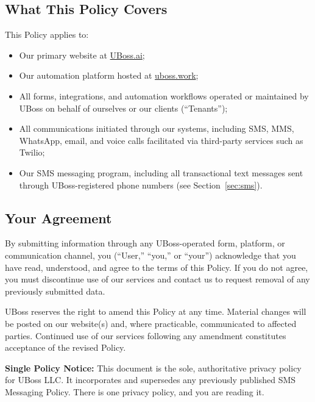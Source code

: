 \documentclass[11pt, letterpaper]{article}
\begin{document}
\subsection{What This Policy Covers}

This Policy applies to:

\begin{itemize}
    \item Our primary website at \href{https://uboss.ai}{UBoss.ai};
    \item Our automation platform hosted at \href{https://uboss.work}{uboss.work};
    \item All forms, integrations, and automation workflows operated or maintained by UBoss
          on behalf of ourselves or our clients (``Tenants'');
    \item All communications initiated through our systems, including SMS, MMS, WhatsApp,
          email, and voice calls facilitated via third-party services such as Twilio;
    \item Our SMS messaging program, including all transactional text messages sent through
          UBoss-registered phone numbers (see Section~\ref{sec:sms}).
\end{itemize}

\subsection{Your Agreement}

By submitting information through any UBoss-operated form, platform, or communication
channel, you (``User,'' ``you,'' or ``your'') acknowledge that you have read, understood,
and agree to the terms of this Policy. If you do not agree, you must discontinue use of
our services and contact us to request removal of any previously submitted data.

UBoss reserves the right to amend this Policy at any time. Material changes will be posted
on our website(s) and, where practicable, communicated to affected parties. Continued use
of our services following any amendment constitutes acceptance of the revised Policy.

\begin{tcolorbox}[keyhighlight]
\textbf{Single Policy Notice:} This document is the sole, authoritative privacy policy
for UBoss LLC. It incorporates and supersedes any previously published SMS Messaging
Policy. There is one privacy policy, and you are reading it.
\end{tcolorbox}
\end{document}
